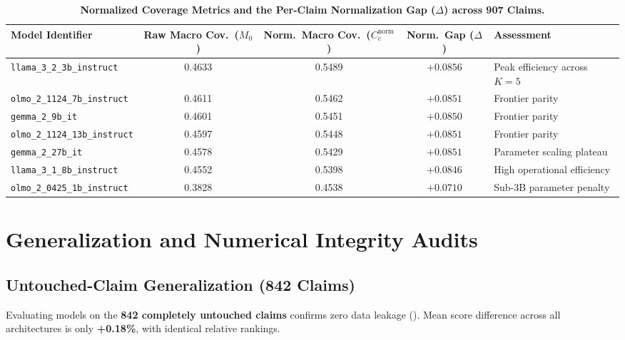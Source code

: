 \documentclass[11pt,a4paper]{article}
\begin{document}
\begin{table}[htbp]
\centering
\small
\caption{\textbf{Normalized Coverage Metrics and the Per-Claim Normalization Gap ($\Delta$) across 907 Claims.}}
\label{tab:normalization_gap}
\begin{adjustbox}{max width=\linewidth}
\begin{tabular}{l c c c p{2.6cm}}
\toprule
\textbf{Model Identifier} & \makecell{\textbf{Raw Macro}\\\textbf{Cov.~($M_0$)}} & \makecell{\textbf{Norm.~Macro}\\\textbf{Cov.~($C_c^{\text{norm}}$)}} & \makecell{\textbf{Norm.~Gap}\\\textbf{($\Delta$)}} & \textbf{Assessment} \\
\midrule
\texttt{llama\_3\_2\_3b\_instruct} & 0.4633 & 0.5489 & $+0.0856$ & Peak efficiency across $K=5$ \\
\texttt{olmo\_2\_1124\_7b\_instruct} & 0.4611 & 0.5462 & $+0.0851$ & Frontier parity \\
\texttt{gemma\_2\_9b\_it} & 0.4601 & 0.5451 & $+0.0850$ & Frontier parity \\
\texttt{olmo\_2\_1124\_13b\_instruct} & 0.4597 & 0.5448 & $+0.0851$ & Frontier parity \\
\texttt{gemma\_2\_27b\_it} & 0.4578 & 0.5429 & $+0.0851$ & Parameter scaling plateau \\
\texttt{llama\_3\_1\_8b\_instruct} & 0.4552 & 0.5398 & $+0.0846$ & High operational efficiency \\
\texttt{olmo\_2\_0425\_1b\_instruct} & 0.3828 & 0.4538 & $+0.0710$ & Sub-3B parameter penalty \\
\bottomrule
\end{tabular}
\end{adjustbox}
\end{table}

\section{Generalization and Numerical Integrity Audits}
\label{sec:integrity}

\subsection{Untouched-Claim Generalization (842 Claims)}
Evaluating models on the \textbf{842 completely untouched claims} confirms zero data leakage (). Mean score difference across all architectures is only \textbf{+0.18\%}, with identical relative rankings.
\end{document}
